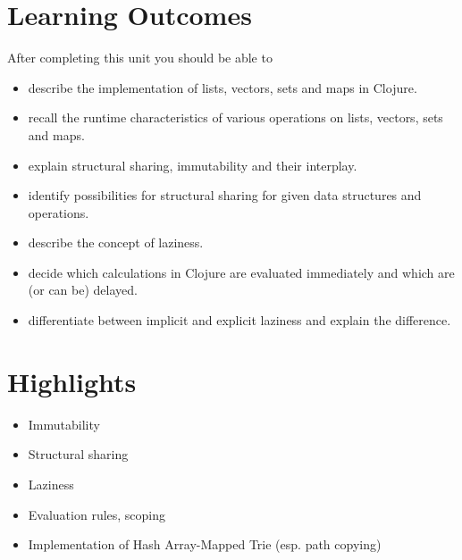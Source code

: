 \documentclass[11pt,a4paper]{article}
\begin{document}
\section{Learning Outcomes}

After completing this unit you should be able to

\begin{itemize}
	\item describe the implementation of lists, vectors, sets and maps in Clojure.
    \item recall the runtime characteristics of various operations on lists, vectors, sets and maps.
    \item explain structural sharing, immutability and their interplay.
    \item identify possibilities for structural sharing for given data structures and operations.
    \item describe the concept of laziness.
    \item decide which calculations in Clojure are evaluated immediately and which are (or can be) delayed.
    \item differentiate between implicit and explicit laziness and explain the difference.
\end{itemize}

\section{Highlights}

\begin{itemize}
    \item Immutability
    \item Structural sharing
    \item Laziness
    \item Evaluation rules, scoping
    \item Implementation of Hash Array-Mapped Trie (esp. path copying)
\end{itemize}
\end{document}
